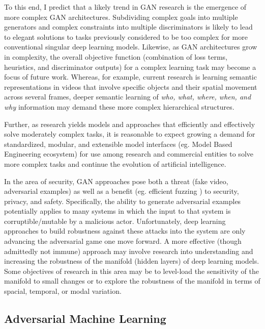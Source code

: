 \documentclass[11pt]{article}
\begin{document}
To this end, I predict that a likely trend in GAN research is the emergence of more complex GAN architectures.  Subdividing complex goals into multiple generators and complex constraints into multiple discriminators is likely to lead to elegant solutions to tasks previously considered to be too complex for more conventional singular deep learning models.  Likewise, as GAN architectures grow in complexity, the overall objective function (combination of loss terms, heuristics, and discriminator outputs) for a complex learning task may become a focus of future work.  Whereas, for example, current research is learning semantic representations in videos that involve specific objects and their spatial movement across several frames, deeper semantic learning of \textit{who, what, where, when, and why} information may demand these more complex hierarchical structures.

Further, as research yields models and approaches that efficiently and effectively solve moderately complex tasks, it is reasonable to expect growing a demand for standardized, modular, and extensible model interfaces (eg. Model Based Engineering ecosystem) for use among research and commercial entities to solve more complex tasks and continue the evolution of artificial intelligence.

In the area of security, GAN approaches pose both a threat (fake video, adversarial examples) as well as a benefit (eg. efficient fuzzing \cite{hu2018ganfuzz}) to security, privacy, and safety.  Specifically, the ability to generate adversarial examples potentially applies to many systems in which the input to that system is corruptible/mutable by a malicious actor.  Unfortunately, deep learning approaches to build robustness against these attacks into the system are only advancing the adversarial game one move forward.  A more effective (though admittedly not immune) approach may involve research into understanding and increasing the robustness of the manifold (hidden layers) of deep learning models.  Some objectives of research in this area may be to level-load the sensitivity of the manifold to small changes or to explore the robustness of the manifold in terms of spacial, temporal, or modal variation.

\subsection{Adversarial Machine Learning}
\end{document}
